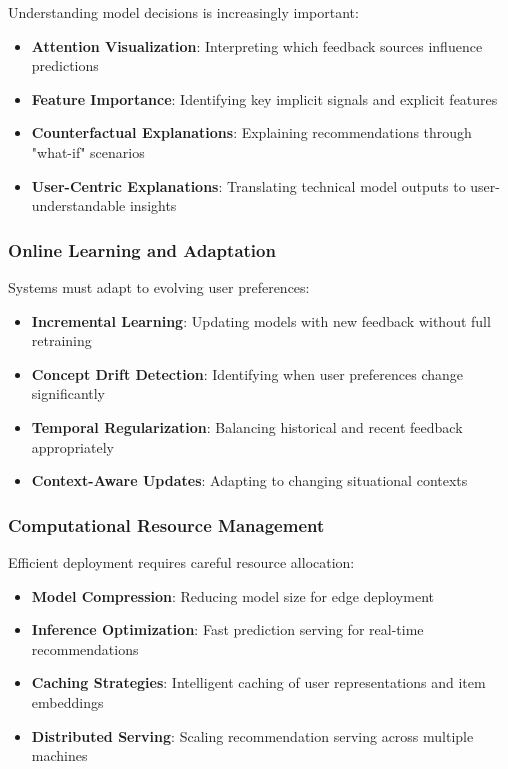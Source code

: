 Understanding model decisions is increasingly important:

\begin{itemize}
    \item \textbf{Attention Visualization}: Interpreting which feedback sources influence predictions
    \item \textbf{Feature Importance}: Identifying key implicit signals and explicit features
    \item \textbf{Counterfactual Explanations}: Explaining recommendations through "what-if" scenarios
    \item \textbf{User-Centric Explanations}: Translating technical model outputs to user-understandable insights
\end{itemize}

\subsubsection{Online Learning and Adaptation}

Systems must adapt to evolving user preferences:

\begin{itemize}
    \item \textbf{Incremental Learning}: Updating models with new feedback without full retraining
    \item \textbf{Concept Drift Detection}: Identifying when user preferences change significantly
    \item \textbf{Temporal Regularization}: Balancing historical and recent feedback appropriately
    \item \textbf{Context-Aware Updates}: Adapting to changing situational contexts
\end{itemize}

\subsubsection{Computational Resource Management}

Efficient deployment requires careful resource allocation:

\begin{itemize}
    \item \textbf{Model Compression}: Reducing model size for edge deployment
    \item \textbf{Inference Optimization}: Fast prediction serving for real-time recommendations
    \item \textbf{Caching Strategies}: Intelligent caching of user representations and item embeddings
    \item \textbf{Distributed Serving}: Scaling recommendation serving across multiple machines
\end{itemize}

